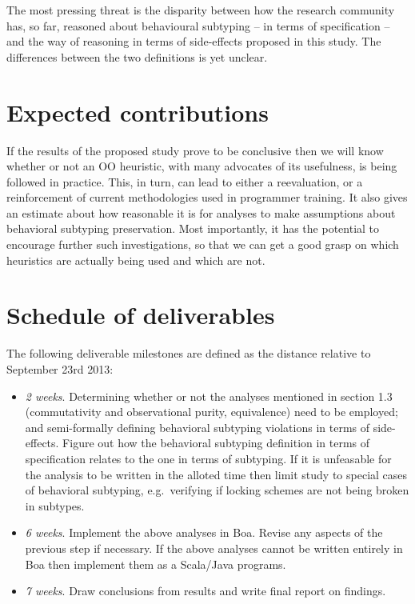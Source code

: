 \documentclass{acm_proc_article-sp}
\begin{document}
The most pressing threat is the disparity between how the research community has, so far, reasoned about behavioural subtyping -- in terms of specification \cite{liskov1994behavioral, dhara1996forcing, liskov1999behavioral, leavens2006behavioral} -- and the way of reasoning in terms of side-effects proposed in this study. The differences between the two definitions is yet unclear.

\section{Expected contributions}
If the results of the proposed study prove to be conclusive then we will know whether or not an OO heuristic, with many advocates of its usefulness, is being followed in practice. This, in turn, can lead to either a reevaluation, or a reinforcement of current methodologies used in programmer training. It also gives an estimate about how reasonable it is for analyses to make assumptions about behavioral subtyping preservation. Most importantly, it has the potential to encourage further such investigations, so that we can get a good grasp on which heuristics are actually being used and which are not.

\section{Schedule of deliverables}
The following deliverable milestones are defined as the distance relative to September 23rd 2013:\begin{itemize}
  \item \emph{2 weeks}. Determining whether or not the analyses mentioned in section 1.3 (commutativity and observational purity, equivalence) need to be employed; and semi-formally defining behavioral subtyping violations in terms of side-effects. Figure out how the behavioral subtyping definition in terms of specification relates to the one in terms of subtyping. If it is unfeasable for the analysis to be written in the alloted time then limit study to special cases of behavioral subtyping, e.g.\ verifying if locking schemes are not being broken in subtypes.
  \item \emph{6 weeks}. Implement the above analyses in Boa. Revise any aspects of the previous step if necessary. If the above analyses cannot be written entirely in Boa then implement them as a Scala/Java programs.
  \item \emph{7 weeks}. Draw conclusions from results and write final report on findings.
\end{itemize}



%


\balancecolumns
\end{document}
